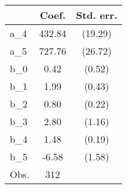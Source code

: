 {
\def\sym#1{\ifmmode^{#1}\else\(^{#1}\)\fi}
\begin{tabular}{l*{1}{cc}}
\hline\hline
                &    Coef.&Std. err.\\
\hline
a\_4             &   432.84&  (19.29)\\
a\_5             &   727.76&  (26.72)\\
b\_0             &     0.42&   (0.52)\\
b\_1             &     1.99&   (0.43)\\
b\_2             &     0.80&   (0.22)\\
b\_3             &     2.80&   (1.16)\\
b\_4             &     1.48&   (0.19)\\
b\_5             &    -6.58&   (1.58)\\
\hline
Obs.            &      312&         \\
\hline\hline
\end{tabular}
}

